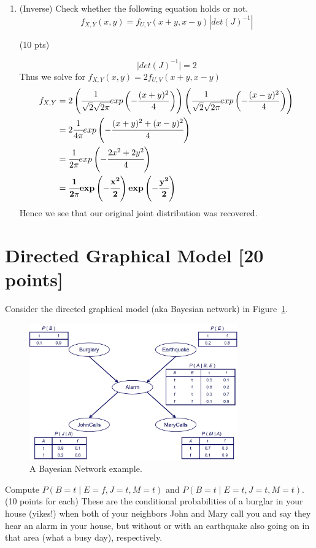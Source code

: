 \documentclass[a4paper]{article}
\theoremstyle{definition}
\newcommand{\abs}[1]{\lvert#1\rvert}
\newenvironment{soln}{
	\leavevmode\color{blue}\ignorespaces
}{}
\begin{document}
\begin{enumerate}[label=(\alph*)]
		\item (Inverse) Check whether the following equation holds or not.
		$$f_{X, Y}(x, y)=f_{U, V}(x+y, x-y)|det(J)^{-1}|$$
		
		\hfill (10 pts) 
		  
		\begin{soln}
                $$\abs{det(J)^{-1}} = 2$$
                Thus we solve for $f_{X, Y}(x, y)=2f_{U, V}(x+y, x-y)$
                \begin{align*}
                    f_{X, Y} &= 2\left(\cfrac{1}{\sqrt{2}\sqrt{2\pi}}exp\left(-\frac{(x+y)^2}{4}\right)\right) \left(\cfrac{1}{\sqrt{2}\sqrt{2\pi}}exp\left(-\frac{(x-y)^2}{4}\right)\right) \\
                    &= 2\cfrac{1}{4\pi}exp\left(-\cfrac{(x+y)^2+(x-y)^2}{4}\right) \\
                    &= \cfrac{1}{2\pi}exp\left(-\cfrac{2x^2+2y^2}{4}\right) \\
                    &= \mathbf{\cfrac{1}{2\pi}exp\left(-\cfrac{x^2}{2}\right)exp\left(-\cfrac{y^2}{2}\right)}
                \end{align*}
                Hence we see that our original joint distribution was recovered.
            \end{soln}
	\end{enumerate}

\section{Directed Graphical Model [20 points]}
Consider the directed graphical model (aka Bayesian network) in Figure~\ref{fig:bn}.
\begin{figure}[H]
    \centering
    \includegraphics[width=0.8\textwidth]{Images/Base/BN.jpg}
    \caption{A Bayesian Network example.}
    \label{fig:bn}
\end{figure}
Compute $P(B=t \mid E=f,J=t,M=t)$ and $P(B=t \mid E=t,J=t,M=t)$. (10 points for each) These are the conditional probabilities of a burglar in your house (yikes!) when both of your neighbors John and Mary call you and say they hear an alarm in your house, but without or with an earthquake also going on in that area (what a busy day), respectively.
\end{document}
